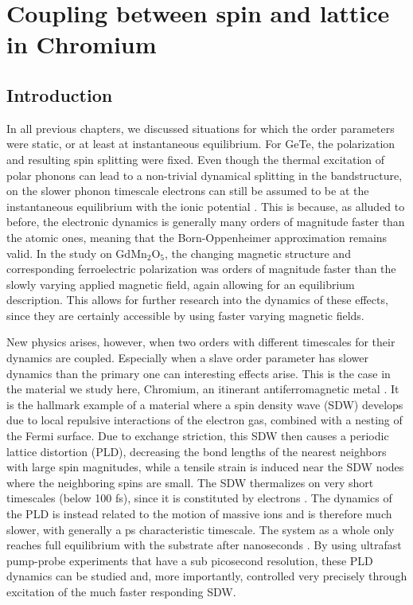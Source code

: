 \chapter{Coupling between spin and lattice in Chromium \label{ch:CrSDW}}
\section{Introduction}
In all previous chapters, we discussed situations for which the order parameters were static, or at least at instantaneous equilibrium.
For GeTe, the polarization and resulting spin splitting were fixed.
Even though the thermal excitation of polar phonons can lead to a non-trivial dynamical splitting in the bandstructure, on the slower phonon timescale electrons can still be assumed to be at the instantaneous equilibrium with the ionic potential \cite{Monserrat2017}.
This is because, as alluded to before, the electronic dynamics is generally many orders of magnitude faster than the atomic ones, meaning that the Born-Oppenheimer approximation remains valid.
In the study on GdMn$_2$O$_5$, the changing magnetic structure and corresponding ferroelectric polarization was orders of magnitude faster than the slowly varying applied magnetic field, again allowing for an equilibrium description.
This allows for further research into the dynamics of these effects, since they are certainly accessible by using faster varying magnetic fields.

New physics arises, however, when two orders with different timescales for their dynamics are coupled.
Especially when a slave order parameter has slower dynamics than the primary one can interesting effects arise.
This is the case in the material we study here, Chromium, an itinerant antiferromagnetic metal \cite{Kulikov1984,Fawcett1988}.
It is the hallmark example of a material where a spin density wave (SDW) develops due to local repulsive interactions of the electron gas, combined with a nesting of the Fermi surface.
Due to exchange striction, this SDW then causes a periodic lattice distortion (PLD), decreasing the bond lengths of the nearest neighbors with large spin magnitudes, while a tensile strain is induced near the SDW nodes where the neighboring spins are small. 
The SDW thermalizes on very short timescales (below 100 fs), since it is constituted by electrons \cite{Nicholson2016}.
The dynamics of the PLD is instead related to the motion of massive ions and is therefore much slower, with generally a ps characteristic timescale.
The system as a whole only reaches full equilibrium with the substrate after nanoseconds \cite{Singer2015prb}. 
By using ultrafast pump-probe experiments that have a sub picosecond resolution, these PLD dynamics can be studied and, more importantly, controlled very precisely through excitation of the much faster responding SDW.

